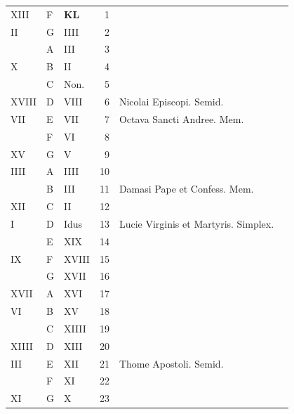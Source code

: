 \begin{center}
\begin{tabular}{l | l | l | r | l l}
\color{Red} XIII & F & \textbf{\color{Red} K\color{Blue}L} & 1 & \\
\color{Red} II & G & \color{Red} IIII & 2 & \\
\color{Red}  & \color{Red} A & \color{Red} III & 3 & & \color{Red} \\
\color{Red} X & B & \color{Red} II & 4 & & \color{Red} \\
\color{Red}  & C & \color{Red} Non. & 5 & & \color{Red} \\
\color{Red} XVIII & D & \color{Red} VIII & 6 & \color{Red} Nicolai Episcopi. Semid. & \color{Red} \\
\color{Red} VII & E & \color{Red} VII & 7 & \color{Red} Octava Sancti Andree. Mem. \\
\color{Red}  & F & \color{Red} VI & 8 & & \color{Red} \\
\color{Red} XV & G & \color{Red} V & 9 &  & \color{Red} \\
\color{Red} IIII & \color{Red} A & \color{Red} IIII & 10 &  & \color{Red} \\
\color{Red}  & B & \color{Red} III & 11 & Damasi Pape et Confess. Mem. & \color{Red} \\
\color{Red} XII & C & \color{Red} II & 12 &  & \color{Red} \\
\color{Red} I & D & \color{Red} Idus & 13 & Lucie Virginis et Martyris. Simplex. & \color{Red} \\
\color{Red}  & E & \color{Red} XIX & 14 &  & \color{Red} \\
\color{Red} IX & F & \color{Red} XVIII & 15 & \\
\color{Red}  & G & \color{Red} XVII & 16 & & \color{Red} \\
\color{Red} XVII & \color{Red} A & \color{Red} XVI & 17 & \\%
\color{Red} VI & B & \color{Red} XV & 18 & \\
\color{Red}  & C & \color{Red} XIIII & 19 & & \color{Red} \\
\color{Red} XIIII & D & \color{Red} XIII & 20 & & \color{Red} \\
\color{Red} III & E & \color{Red} XII & 21 & Thome Apostoli. Semid. & \color{Red} \\
\color{Red}  & F & \color{Red} XI & 22 & & \color{Red} \\
\color{Red} XI & G & \color{Red} X & 23 & & \color{Red} \\

\end{tabular}
\end{center}
